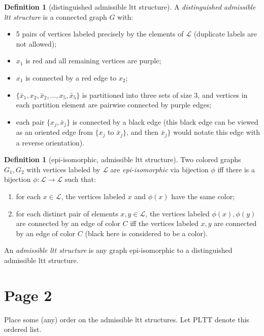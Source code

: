 \documentclass[11pt]{article}
\theoremstyle{definition}
\newtheorem{dfn}[thm]{Definition}
\begin{document}
\begin{dfn}[distinguished admissible ltt structure]
A \emph{distinguished admissible ltt structure} is a connected graph $G$ with:
\begin{itemize}
  \item 5 pairs of vertices labeled precisely by the elements of $\mathcal{L}$ (duplicate labels are not allowed);
  \item $x_1$ is red and all remaining vertices are purple;
  \item $x_1$ is connected by a red edge to $x_2$;
  \item $\{\bar{x}_1,x_2,\bar{x}_2,\ldots,x_5,\bar{x}_5\}$ is partitioned into
        three sets of size $3$, and vertices in each partition element are pairwise connected by purple edges;
  \item each pair $\{x_j,\bar{x}_j\}$ is connected by a black edge (this black edge can be viewed as an oriented edge from $\{x_j$ to $\bar{x}_j\}$, and then $\bar{x}_j\}$ would notate this edge with a reverse orientation).
\end{itemize}
\end{dfn}

\begin{dfn}[epi-isomorphic, admissible ltt structure]
Two colored graphs $G_1,G_2$ with vertices labeled by $\mathcal{L}$ are
\emph{epi-isomorphic} via bijection $\phi$ iff there is a bijection $\phi:\mathcal{L}\to\mathcal{L}$ such that:
\begin{enumerate}[label=(\roman*)]
  \item for each $x\in\mathcal{L}$, the vertices labeled $x$ and $\phi(x)$ have
        the same color;
  \item for each distinct pair of elements $x,y\in\mathcal{L}$, the vertices labeled
        $\phi(x),\phi(y)$ are connected by an edge of color $C$ iff the vertices
        labeled $x,y$ are connected by an edge of color $C$ (black here is considered to be a color).
\end{enumerate}
An \emph{admissible ltt structure} is any graph epi-isomorphic to a distinguished
admissible ltt structure.
\end{dfn}



\medskip


\section*{Page 2}

Place some (any) order on the admissible ltt structures.
Let $\mathrm{PLTT}$ denote this ordered list.
\end{document}
